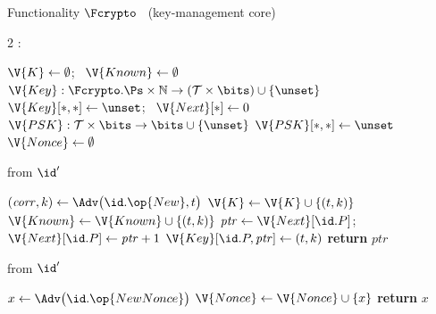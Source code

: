 \begin{interface}[nofloat]{Functionality $\Fcrypto$ \ (key-management core) \\
}

{\scriptsize
\setlength{\columnsep}{1.4em}
\begin{multicols}{2}
:
\begin{algorithmic}[1]
\setcounter{contline}{0}\algcont
\State $\V{K} \gets \emptyset$; \ $\V{Known} \gets \emptyset$
\State $\V{Key} : \Fcrypto.\Ps \times \mathbb{N} \to (\mathcal{T} \times \bits) \cup \{\unset\}$
\State $\V{Key}[*,*] \gets \unset$; \ $\V{Next}[*] \gets 0$
\State $\V{PSK} : \mathcal{T} \times \bits \to \bits \cup \{\unset\}$
\State $\V{PSK}[*,*] \gets \unset$
\State $\V{Nonce} \gets \emptyset$
\algsave
\end{algorithmic}
\vspace{1.4ex}

 \quad from $\id'$
\begin{algorithmic}[1]
\algcont
{}
\State $(\mathit{corr}, k) \gets \Adv\bigl(\id.\op{New}, t\bigr)$ \label{ln:crynewask}
 \label{ln:crynewclean}
\State $\V{K} \gets \V{K} \cup \{(t,k)\}$
  \State $\V{Known} \gets \V{Known} \cup \{(t,k)\}$ \label{ln:cryknown}
\EndIf
\State $\mathit{ptr} \gets \V{Next}[\id.P]$; \ $\V{Next}[\id.P] \gets \mathit{ptr} + 1$
\State $\V{Key}[\id.P, \mathit{ptr}] \gets (t,k)$
\State \textbf{return} $\mathit{ptr}$
\algsave
\end{algorithmic}
\vspace{1.4ex}

 \quad from $\id'$
\begin{algorithmic}[1]
\algcont
\State $x \gets \Adv\bigl(\id.\op{NewNonce}\bigr)$
 \label{ln:crynonce}
\State $\V{Nonce} \gets \V{Nonce} \cup \{x\}$
\State \textbf{return} $x$
\algsave
\end{algorithmic}
\vspace{1.4ex}


\end{multicols}}
\end{interface}
